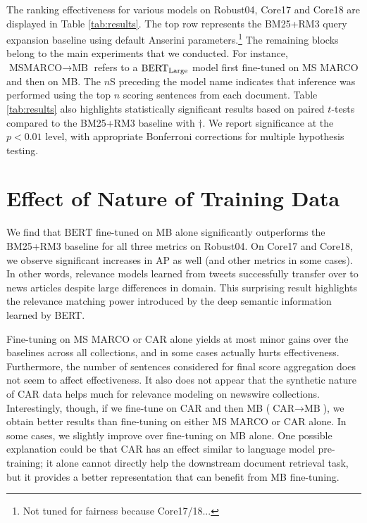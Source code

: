 The ranking effectiveness for various models on Robust04, Core17 and Core18 are displayed in Table \ref{tab:results}.
The top row represents the BM25+RM3 query expansion baseline using default Anserini parameters.\footnote{Not tuned for fairness because Core17/18...}
The remaining blocks belong to the main experiments that we conducted.
For instance, $\textrm{MSMARCO}\rightarrow\textrm{MB}$ refers to a $\textrm{BERT}_{\textrm{\scriptsize Large}}$ model first fine-tuned on MS MARCO and then on MB.
The $n$S preceding the model name indicates that inference was performed using the top $n$ scoring sentences from each document.
Table \ref{tab:results} also highlights statistically significant results based on paired $ t $-tests compared to the BM25+RM3 baseline with ${\dagger}$. 
We report significance at the $p<0.01$ level, with appropriate Bonferroni corrections for multiple hypothesis testing.

\section{Effect of Nature of Training Data}

We find that $ \textrm{BERT} $ fine-tuned on MB alone significantly outperforms the BM25+RM3 baseline for all three metrics on Robust04.
On Core17 and Core18, we observe significant increases in AP as well (and other metrics in some cases).
In other words, relevance models learned from tweets successfully transfer over to news articles despite large differences in domain.
This surprising result highlights the relevance matching power introduced by the deep semantic information learned by BERT.

Fine-tuning on MS MARCO or CAR alone yields at most minor gains over the baselines across all collections, and in some cases actually hurts effectiveness.
Furthermore, the number of sentences considered for final score aggregation does not seem to affect effectiveness.
It also does not appear that the synthetic nature of CAR data helps much for relevance modeling on newswire collections.
Interestingly, though, if we fine-tune on CAR and then MB ($\textrm{CAR}\rightarrow\textrm{MB}$), we obtain better results than fine-tuning on either MS MARCO or CAR alone.
In some cases, we slightly improve over fine-tuning on MB alone.
One possible explanation could be that CAR has an effect similar to language model pre-training; it alone cannot directly help the downstream document retrieval task, but it provides a better representation that can benefit from MB fine-tuning.

